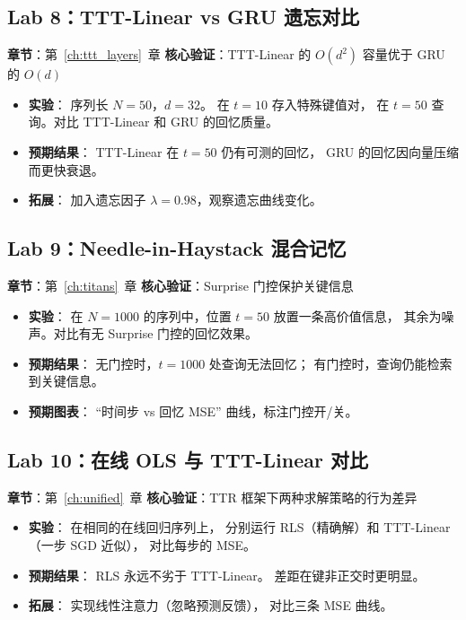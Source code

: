 \subsection{Lab 8：TTT-Linear vs GRU 遗忘对比}

\textbf{章节}：第~\ref{ch:ttt_layers}~章 \quad
\textbf{核心验证}：TTT-Linear 的 $O(d^2)$ 容量优于 GRU 的 $O(d)$

\begin{itemize}
  \item \textbf{实验}：
    序列长 $N=50$，$d=32$。
    在 $t=10$ 存入特殊键值对，
    在 $t=50$ 查询。对比 TTT-Linear 和 GRU 的回忆质量。

  \item \textbf{预期结果}：
    TTT-Linear 在 $t=50$ 仍有可测的回忆，
    GRU 的回忆因向量压缩而更快衰退。

  \item \textbf{拓展}：
    加入遗忘因子 $\lambda = 0.98$，观察遗忘曲线变化。
\end{itemize}

\subsection{Lab 9：Needle-in-Haystack 混合记忆}

\textbf{章节}：第~\ref{ch:titans}~章 \quad
\textbf{核心验证}：Surprise 门控保护关键信息

\begin{itemize}
  \item \textbf{实验}：
    在 $N=1000$ 的序列中，位置 $t=50$ 放置一条高价值信息，
    其余为噪声。对比有无 Surprise 门控的回忆效果。

  \item \textbf{预期结果}：
    无门控时，$t=1000$ 处查询无法回忆；
    有门控时，查询仍能检索到关键信息。

  \item \textbf{预期图表}：
    ``时间步 vs 回忆 MSE'' 曲线，标注门控开/关。
\end{itemize}

\subsection{Lab 10：在线 OLS 与 TTT-Linear 对比}

\textbf{章节}：第~\ref{ch:unified}~章 \quad
\textbf{核心验证}：TTR 框架下两种求解策略的行为差异

\begin{itemize}
  \item \textbf{实验}：
    在相同的在线回归序列上，
    分别运行 RLS（精确解）和 TTT-Linear（一步 SGD 近似），
    对比每步的 MSE。

  \item \textbf{预期结果}：
    RLS 永远不劣于 TTT-Linear。
    差距在键非正交时更明显。

  \item \textbf{拓展}：
    实现线性注意力（忽略预测反馈），
    对比三条 MSE 曲线。
\end{itemize}

